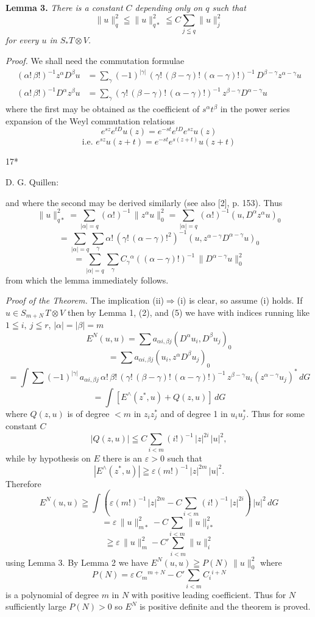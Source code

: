 \textbf{Lemma 3.} \emph{There is a constant $C$ depending only on $q$ such that}
\[ \|u\|_q^2 \leqq \|u\|_{q*}^2 \leqq C \sum_{j \leqq q} \|u\|_j^2 \]
\emph{for every $u$ in $S_* T \otimes V$.}

\emph{Proof.} We shall need the commutation formulae
\[ \begin{aligned} (\alpha!\,\beta!)^{-1} z^{\alpha} D^{\beta} u &= \sum_{\gamma} (-1)^{|\gamma|}\, (\gamma!\,(\beta-\gamma)!\,(\alpha-\gamma)!)^{-1}\, D^{\beta-\gamma} z^{\alpha-\gamma} u \\
(\alpha!\,\beta!)^{-1} D^{\alpha} z^{\beta} u &= \sum_{\gamma} (\gamma!\,(\beta-\gamma)!\,(\alpha-\gamma)!)^{-1}\, z^{\beta-\gamma} D^{\alpha-\gamma} u \end{aligned} \tag{5} \]
where the first may be obtained as the coefficient of $s^{\alpha} t^{\beta}$ in the power
series expansion of the Weyl commutation relations
\[ e^{sz} e^{tD} u(z) = e^{-st} e^{tD} e^{sz} u(z) \]
\[ \text{i.e. } e^{sz} u(z+t) = e^{-st} e^{s(z+t)} u(z+t) \]

17*


 D. G. Quillen:

and where the second may be derived similarly (see also [2], p. 153). Thus
\[ \|u\|^2_{q*} = \sum_{|\alpha|=q} (\alpha!)^{-1}\, \|z^\alpha u\|^2_0 = \sum_{|\alpha|=q} (\alpha!)^{-1} (u, D^\alpha z^\alpha u)_0 \]
\[ = \sum_{|\alpha|=q} \sum_{\gamma} \alpha!\,(\gamma!\,(\alpha-\gamma)!^2)^{-1} (u, z^{\alpha-\gamma} D^{\alpha-\gamma} u)_0 \]
\[ = \sum_{|\alpha|=q} \sum_{\gamma} C_\gamma{}^\alpha ((\alpha-\gamma)!)^{-1}\, \|D^{\alpha-\gamma} u\|^2_0 \]
from which the lemma immediately follows.

\emph{Proof of the Theorem.} The implication (ii)$\Rightarrow$(i) is clear, so assume (i)
holds. If $u \in S_{m+N}\, T \otimes V$ then by Lemma 1, (2), and (5) we have with
indices running like $1 \leqq i,\ j \leqq r$, $|\alpha| = |\beta| = m$
\[ E^N(u,u) = \sum a_{\alpha i, \beta j} (D^\alpha u_i, D^\beta u_j)_0 \]
\[ = \sum a_{\alpha i, \beta j} (u_i, z^\alpha D^\beta u_j)_0 \]
\[ = \int \sum (-1)^{|\gamma|}\, a_{\alpha i, \beta j}\, \alpha!\, \beta!\, (\gamma!\, (\beta-\gamma)!\, (\alpha-\gamma)!)^{-1}\, z^{\beta-\gamma} u_i (z^{\alpha-\gamma} u_j)^*\, dG \]
\[ = \int [E^\wedge (z^*, u) + Q(z,u)]\, dG \]
where $Q(z,u)$ is of degree $<m$ in $z_i z_j^*$ and of degree 1 in $u_i u_j^*$. Thus
for some constant $C$
\[ |Q(z,u)| \leqq C \sum_{i<m} (i!)^{-1}\, |z|^{2i}\, |u|^2, \]
while by hypothesis on $E$ there is an $\varepsilon > 0$ such that
\[ |E^\wedge (z^*, u)| \geqq \varepsilon (m!)^{-1}\, |z|^{2m}\, |u|^2. \]
Therefore
\[ E^N(u,u) \geqq \int (\varepsilon (m!)^{-1}\, |z|^{2m} - C \sum_{i<m} (i!)^{-1}\, |z|^{2i})\, |u|^2\, dG \]
\[ = \varepsilon\, \|u\|^2_{m*} - C \sum_{i<m} \|u\|^2_{i*} \]
\[ \geqq \varepsilon\, \|u\|^2_m - C' \sum_{i<m} \|u\|^2_i \]
using Lemma 3. By Lemma 2 we have $E^N(u,u) \geqq P(N)\, \|u\|^2_0$ where
\[ P(N) = \varepsilon\, C_m{}^{m+N} - C' \sum_{i<m} C_i{}^{i+N} \]
is a polynomial of degree $m$ in $N$ with positive leading coefficient. Thus
for $N$ sufficiently large $P(N) > 0$ so $E^N$ is positive definite and the theorem
is proved.

